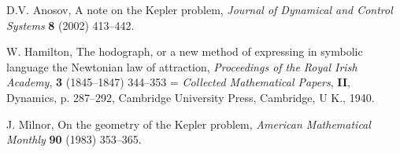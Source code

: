 \documentclass[11pt,openbib]{article}
\begin{document}
\begin{thebibliography}{9}

 D.V. Anosov, A note on the Kepler problem, \textit{Journal of Dynamical and Control 
Systems} \textbf{8} (2002) 413--442.

 W. Hamilton, The hodograph, or a new method of expressing in symbolic 
language the Newtonian law of attraction, 
\textit{Proceedings of the Royal Irish Academy}, \textbf{3} (1845--1847) 344--353 = 
\textit{Collected Mathematical Papers}, \textbf{II}, Dynamics, 
p. 287--292,  Cambridge University {P}ress, {C}ambridge, U K., 1940. 

 J. Milnor, On the geometry of the {K}epler problem, 
\textit{American Mathematical Monthly} \textbf{90} (1983) 353--365. 

\end{thebibliography}
\end{document}
